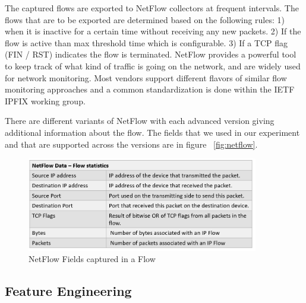The captured flows are exported to NetFlow collectors at frequent intervals. The flows that are to be exported are determined based on the following rules: 1) when it is inactive for a certain time without receiving any new packets. 2) If the flow is active than max threshold time which is configurable. 3) If a TCP flag (FIN / RST) indicates the flow is terminated. NetFlow provides a powerful tool to keep track of what kind of traffic is going on the network, and are widely used for network monitoring. Most vendors support different flavors of similar flow monitoring approaches and a common standardization is done within the IETF IPFIX working group.

There are different variants of NetFlow with each advanced version giving additional information about the flow. The fields that we used in our experiment and that are supported across the versions are in figure ~\ref{fig:netflow}.

\begin{figure}[ht]
	\centering
	\includegraphics[width=0.9\textwidth]{netflow.png}
	\caption{NetFlow Fields captured in a Flow }
\end{figure}

\subsection{Feature Engineering}

